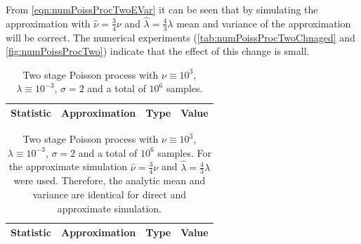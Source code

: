 \documentclass{amsart}
\numberwithin{equation}{section}
\begin{document}
\noindent From \autoref{eqn:numPoissProcTwoEVar} it can be seen that by simulating the approximation with $\hat{\nu} = \frac{3}{4} \nu$ and $\hat{\lambda} = \frac{4}{3} \lambda$ mean and variance of the approximation will be correct. The numerical experiments (\autoref{tab:numPoissProcTwoChnaged} and \autoref{fig:numPoissProcTwo}) indicate that the effect of this change is small.

\begin{table}
    \begin{tabular}{ |c|c|r|r| }
    \hline
    \textbf{Statistic} & \textbf{Approximation} & \textbf{Type} & \textbf{Value}\\
    \hline\hline
    
    \hline
    \end{tabular}
    \caption{Two stage Poisson process with $\nu \equiv 10^3$, $\lambda \equiv 10^{-3}$, $\sigma = 2$ and a total of $10^6$ samples.}
    \label{tab:numPoissProcTwo}
\end{table}

\begin{table}
    \begin{tabular}{ |c|c|r|r| }
    \hline
    \textbf{Statistic} & \textbf{Approximation} & \textbf{Type} & \textbf{Value}\\
    \hline\hline
    
    \hline
    \end{tabular}
    \caption{Two stage Poisson process with $\nu \equiv 10^3$, $\lambda \equiv 10^{-3}$, $\sigma = 2$ and a total of $10^6$ samples. For the approximate simulation $\hat{\nu} = \frac{3}{4} \nu$ and $\hat{\lambda} = \frac{4}{3} \lambda$ were used. Therefore, the analytic mean and variance are identical for direct and approximate simulation.}
    \label{tab:numPoissProcTwoChnaged}
\end{table}
\end{document}

